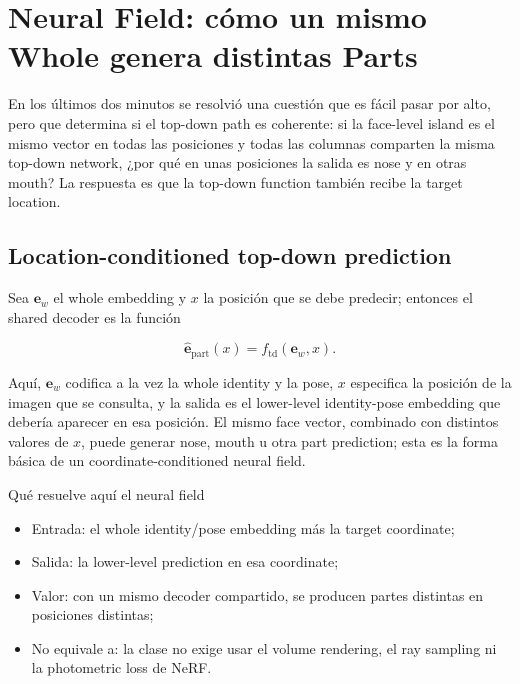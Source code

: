 \section{Neural Field: cómo un mismo Whole genera distintas Parts}

En los últimos dos minutos se resolvió una cuestión que es fácil pasar por alto, pero que determina si el top-down path es coherente: si la face-level island es el mismo vector en todas las posiciones y todas las columnas comparten la misma top-down network, ¿por qué en unas posiciones la salida es nose y en otras mouth? La respuesta es que la top-down function también recibe la target location.

\subsection{Location-conditioned top-down prediction}

Sea $\mathbf e_w$ el whole embedding y $x$ la posición que se debe predecir; entonces el shared decoder es la función

\[
\hat{\mathbf e}_{\mathrm{part}}(x)=f_{\mathrm{td}}\!\left(\mathbf e_w,x\right).
\]

Aquí, $\mathbf e_w$ codifica a la vez la whole identity y la pose, $x$ especifica la posición de la imagen que se consulta, y la salida es el lower-level identity-pose embedding que debería aparecer en esa posición. El mismo face vector, combinado con distintos valores de $x$, puede generar nose, mouth u otra part prediction; esta es la forma básica de un coordinate-conditioned neural field.


\begin{knowledgebox}{Qué resuelve aquí el neural field}
\begin{itemize}
  \item Entrada: el whole identity/pose embedding más la target coordinate;
  \item Salida: la lower-level prediction en esa coordinate;
  \item Valor: con un mismo decoder compartido, se producen partes distintas en posiciones distintas;
  \item No equivale a: la clase no exige usar el volume rendering, el ray sampling ni la photometric loss de NeRF.
\end{itemize}
\end{knowledgebox}


